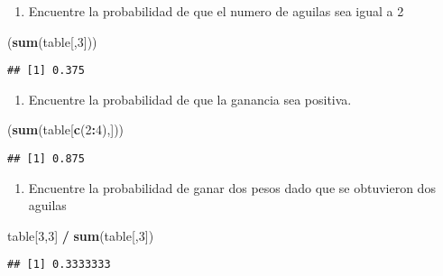 \documentclass[
]{article}
\newenvironment{Shaded}{\begin{snugshade}}{\end{snugshade}}
\newcommand{\DecValTok}[1]{\textcolor[rgb]{0.00,0.00,0.81}{#1}}
\newcommand{\FunctionTok}[1]{\textcolor[rgb]{0.13,0.29,0.53}{\textbf{#1}}}
\newcommand{\NormalTok}[1]{#1}
\newcommand{\SpecialCharTok}[1]{\textcolor[rgb]{0.81,0.36,0.00}{\textbf{#1}}}
\providecommand{\tightlist}{%
  \setlength{\itemsep}{0pt}\setlength{\parskip}{0pt}}
\begin{document}
\begin{enumerate}
\def\labelenumi{\alph{enumi})}
\tightlist
\item
  Encuentre la probabilidad de que el numero de aguilas sea igual a 2
\end{enumerate}

\begin{Shaded}
\begin{Highlighting}[]
\NormalTok{(}\FunctionTok{sum}\NormalTok{(table[,}\DecValTok{3}\NormalTok{]))}
\end{Highlighting}
\end{Shaded}

\begin{verbatim}
## [1] 0.375
\end{verbatim}

\begin{enumerate}
\def\labelenumi{\alph{enumi})}
\setcounter{enumi}{1}
\tightlist
\item
  Encuentre la probabilidad de que la ganancia sea positiva.
\end{enumerate}

\begin{Shaded}
\begin{Highlighting}[]
\NormalTok{(}\FunctionTok{sum}\NormalTok{(table[}\FunctionTok{c}\NormalTok{(}\DecValTok{2}\SpecialCharTok{:}\DecValTok{4}\NormalTok{),]))}
\end{Highlighting}
\end{Shaded}

\begin{verbatim}
## [1] 0.875
\end{verbatim}

\begin{enumerate}
\def\labelenumi{\alph{enumi})}
\setcounter{enumi}{2}
\tightlist
\item
  Encuentre la probabilidad de ganar dos pesos dado que se obtuvieron
  dos aguilas
\end{enumerate}

\begin{Shaded}
\begin{Highlighting}[]
\NormalTok{table[}\DecValTok{3}\NormalTok{,}\DecValTok{3}\NormalTok{] }\SpecialCharTok{/} \FunctionTok{sum}\NormalTok{(table[,}\DecValTok{3}\NormalTok{])}
\end{Highlighting}
\end{Shaded}

\begin{verbatim}
## [1] 0.3333333
\end{verbatim}
\end{document}
